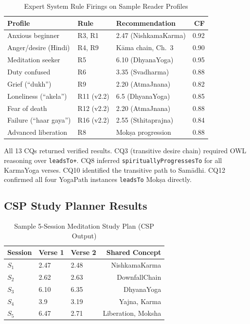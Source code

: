 \documentclass[conference]{IEEEtran}
\begin{document}
\begin{table}[htbp]
\caption{Expert System Rule Firings on Sample Reader Profiles}
\label{tab:expert}
\centering
\begin{tabular}{p{2.0cm}p{1.3cm}p{2.2cm}r}
\toprule
\textbf{Profile} & \textbf{Rule} & \textbf{Recommendation} & \textbf{CF} \\
\midrule
Anxious beginner       & R3, R1         & 2.47 (NishkamaKarma)   & 0.92 \\
Anger/desire (Hindi)   & R4, R9         & K\={a}ma chain, Ch.~3  & 0.90 \\
Meditation seeker      & R5             & 6.10 (DhyanaYoga)      & 0.95 \\
Duty confused          & R6             & 3.35 (Svadharma)       & 0.88 \\
Grief (``dukh'')       & R9             & 2.20 (AtmaJnana)       & 0.82 \\
Loneliness (``akela'') & R11 (v2.2)     & 6.5  (DhyanaYoga)      & 0.85 \\
Fear of death          & R12 (v2.2)     & 2.20 (AtmaJnana)       & 0.88 \\
Failure (``haar gaya'')& R16 (v2.2)     & 2.55 (Sthitaprajna)    & 0.84 \\
Advanced liberation    & R8             & Mok\d{s}a progression  & 0.88 \\
\bottomrule
\end{tabular}
\end{table}

All 13 CQs returned verified results. CQ3 (transitive desire chain) required
OWL reasoning over \texttt{leadsTo+}. CQ8 inferred \texttt{spirituallyProgressesTo}
for all KarmaYoga verses. CQ10 identified the transitive path to Sam\={a}dhi.
CQ12 confirmed all four YogaPath instances \texttt{leadsTo} Mok\d{s}a directly.

\subsection{CSP Study Planner Results}

\begin{table}[htbp]
\caption{Sample 5-Session Meditation Study Plan (CSP Output)}
\label{tab:csp}
\centering
\begin{tabular}{lllr}
\toprule
\textbf{Session} & \textbf{Verse 1} & \textbf{Verse 2} & \textbf{Shared Concept} \\
\midrule
$S_1$ & 2.47 & 2.48 & NishkamaKarma \\
$S_2$ & 2.62 & 2.63 & DownfallChain \\
$S_3$ & 6.10 & 6.35 & DhyanaYoga \\
$S_4$ & 3.9  & 3.19 & Yajna, Karma \\
$S_5$ & 6.47 & 2.71 & Liberation, Moksha \\
\bottomrule
\end{tabular}
\end{table}
\end{document}

